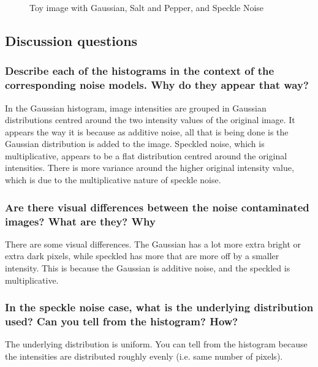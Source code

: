 \documentclass[article, 1.5space, letterpaper, 12pt, oneside, header, footer]{SydeClass}
\begin{document}
\begin{figure}[ht]
{	}
	\caption{Toy image with Gaussian, Salt and Pepper, and Speckle Noise}
	\label{fig:noiseGeneration.toy}
\end{figure}
 

\subsection{Discussion questions}

\subsubsection{ Describe each of the histograms in the context of the corresponding noise models. Why do they appear
that way?}
In the Gaussian histogram, image intensities are grouped in Gaussian distributions centred around the two intensity values of the original image. It appears the way it is because as additive noise, all that is being done is the Gaussian distribution is added to the image. Speckled noise, which is multiplicative, appears to be a flat distribution centred around the original intensities. There is more variance around the higher original intensity value, which is due to the multiplicative nature of speckle noise.

\subsubsection{Are there visual differences between the noise contaminated images? What are they? Why}
There are some visual differences. The Gaussian has a lot more extra bright or extra dark pixels, while speckled has more that are more off by a smaller intensity. This is because the Gaussian is additive noise, and the speckled is multiplicative.

\subsubsection{In the speckle noise case, what is the underlying distribution used? Can you tell from the histogram?
How?}
The underlying distribution is uniform. You can tell from the histogram because the intensities are distributed roughly evenly (i.e. same number of pixels). 
\end{document}
